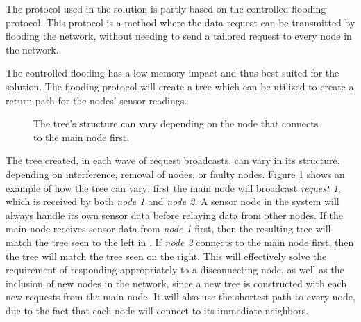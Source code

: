 The protocol used in the solution is partly based on the controlled flooding protocol.
This protocol is a method where the data request can be transmitted by flooding the network, without needing to send a tailored request to every node in the network. 

The controlled flooding has a low memory impact and thus best suited for the solution. The flooding protocol will create a tree which can be utilized to create a return path for the nodes' sensor readings.

\begin{figure}[h!]
	\centering
	\caption{The tree's structure can vary depending on the node that connects to the main node first.}
	\label{fig:treeVariation}
\end{figure}


The tree created, in each wave of request broadcasts, can vary in its structure, depending on interference, removal of nodes, or faulty nodes. Figure \ref{fig:treeVariation} shows an example of how the tree can vary: first the main node will broadcast \textit{request 1}, which is received by both \textit{node 1} and \textit{node 2}. A sensor node in the system will always handle its own sensor data before relaying data from other nodes. If the main node receives sensor data from \textit{node 1} first, then the resulting tree will match the tree seen to the left in . If \textit{node 2} connects to the main node first, then the tree will match the tree seen on the right.
This will effectively solve the requirement of responding appropriately to a disconnecting node, as well as the inclusion of new nodes in the network, since a new tree is constructed with each new requests from the main node.
It will also use the shortest path to every node, due to the fact that each node will connect to its immediate neighbors.

